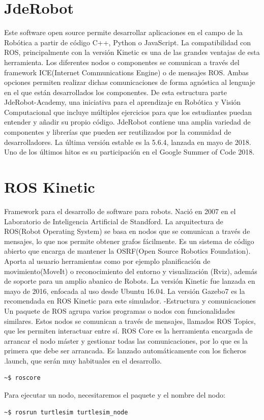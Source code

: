 \documentclass[12pt,spanish,chapterprefix, numbers=noenddot]{book}
\numberwithin{equation}{section}
\numberwithin{figure}{section}
\begin{document}
\section{JdeRobot}
Este software open source permite desarrollar aplicaciones en el campo de la Robótica a partir de código C++, Python o JavaScript. La compatibilidad con ROS, principalmente con la versión Kinetic es una de las grandes ventajas de esta herramienta.  Los diferentes nodos o componentes se comunican a través del framework ICE(Internet Communications Engine) o de mensajes ROS. Ambas opciones permiten realizar dichas comunicaciones de forma agnóstica al lenguaje en el que están desarrollados los componentes.  
De esta estructura parte JdeRobot-Academy, una iniciativa para el aprendizaje en Robótica y Visión Computacional que incluye múltiples ejercicios para que los estudiantes puedan entender y añadir su propio código. JdeRobot  contiene una amplia variedad de componentes y librerías que pueden ser reutilizados por la comunidad de desarrolladores. 
La última versión estable es la 5.6.4, lanzada en mayo de 2018. Uno de los últimos hitos es su participación en el Google Summer of Code 2018. 

\section{ROS Kinetic}
Framework para el desarrollo de software para robots. Nació en 2007 en el Laboratorio de Inteligencia Artificial de Standford. La arquitectura de ROS(Robot Operating System) se basa en nodos que se comunican a través de mensajes, lo que nos permite obtener grafos fácilmente.
Es un sistema de código abierto que encarga de mantener la OSRF(Open Source Robotics Foundation). Aporta al usuario herramientas como por ejemplo planificación de movimiento(MoveIt) o reconocimiento del entorno y visualización (Rviz), además de soporte para un amplio abanico de Robots. 
La versión Kinetic fue lanzada en mayo de 2016, enfocada al uso desde Ubuntu 16.04. La versión Gazebo7 es la recomendada en ROS Kinetic para este simulador. 
-Estructura y comunicaciones
Un paquete de ROS agrupa varios programas o nodos con funcionalidades similares. Estos nodos se comunican  a través de mensajes, llamados ROS Topics, que les permiten interactuar entre sí. 
ROS Core es la herramienta encargada de arrancar el nodo máster y gestionar todas las comunicaciones, por lo que es la primera que debe ser arrancada. Es lanzado automáticamente con los ficheros .launch, que serán muy habituales en el desarrollo. 
\begin{lstlisting}
~$ roscore
\end{lstlisting}
Para ejecutar un nodo, necesitaremos el paquete y el nombre del nodo: 
\begin{lstlisting}
~$ rosrun turtlesim turtlesim_node
\end{lstlisting}
\end{document}
